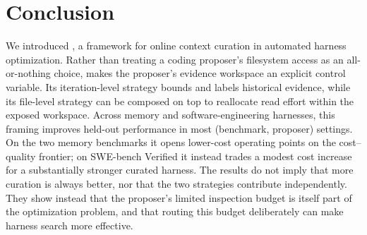 \section{Conclusion}
\label{sec:conclusion}

We introduced \name, a framework for online context curation in automated
harness optimization. Rather than treating a coding proposer's filesystem
access as an all-or-nothing choice, \name makes the proposer's evidence
workspace an explicit control variable. Its iteration-level strategy bounds
and labels historical evidence, while its file-level strategy can be composed
on top to reallocate read effort within the exposed workspace. Across memory
and software-engineering harnesses, this framing improves held-out
performance in most (benchmark, proposer) settings. On the two memory
benchmarks it opens lower-cost operating points on the cost--quality
frontier; on SWE-bench Verified it instead trades a modest cost increase for
a substantially stronger curated harness. The results do not imply that more
curation is always better, nor that the two strategies contribute
independently. They show instead that the proposer's limited inspection
budget is itself part of the optimization problem, and that routing this
budget deliberately can make harness search more effective.
